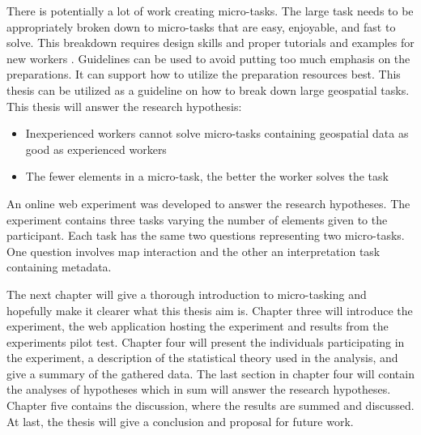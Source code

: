 There is potentially a lot of work creating micro-tasks. The large task needs to be appropriately broken down to micro-tasks that are easy, enjoyable, and fast to solve. This breakdown requires design skills and proper tutorials and examples for new workers \citep{Schulze2012}. 
Guidelines can be used to avoid putting too much emphasis on the preparations. It can support how to utilize the preparation resources best. This thesis can be utilized as a guideline on how to break down large geospatial tasks.\\

This thesis will answer the research hypothesis: 
\begin{itemize}
	\item Inexperienced workers cannot solve micro-tasks containing geospatial data as good as experienced workers
	\item The fewer elements in a micro-task, the better the worker solves the task
\end{itemize}
\vspace{0.3cm}
An online web experiment was developed to answer the research hypotheses. The experiment contains three tasks varying the number of elements given to the participant. Each task has the same two questions representing two micro-tasks. One question involves map interaction and the other an interpretation task containing metadata. 

The next chapter will give a thorough introduction to micro-tasking and hopefully make it clearer what this thesis aim is. Chapter three will introduce the experiment, the web application hosting the experiment and results from the experiments pilot test. Chapter four will present the individuals participating in the experiment, a description of the statistical theory used in the analysis, and give a summary of the gathered data. The last section in chapter four will contain the analyses of hypotheses which in sum will answer the research hypotheses. Chapter five contains the discussion, where the results are summed and discussed. At last, the thesis will give a conclusion and proposal for future work.
 
